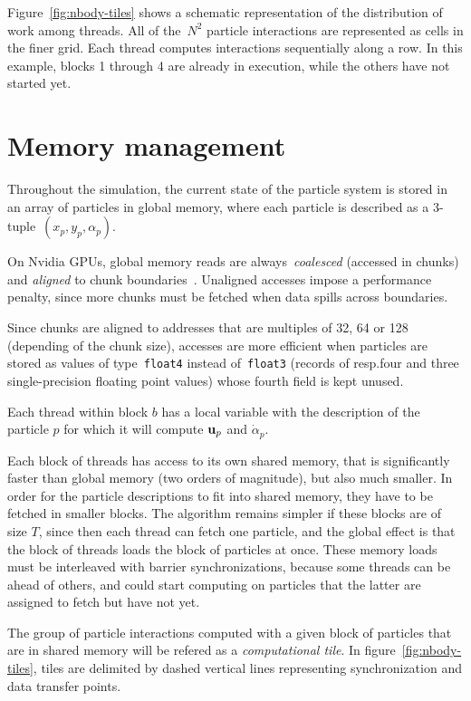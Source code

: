 Figure~\ref{fig:nbody-tiles} shows a schematic representation
of the distribution of work among threads.
All of the~\(N^2\) particle interactions are represented
as cells in the finer grid.
Each thread computes interactions sequentially along a row.
In this example, blocks 1 through 4 are already in execution,
while the others have not started yet.

\section{Memory management}
\label{sec:memory-management}

Throughout the simulation,
the current state of the particle system
is stored in an array of particles in global memory,
where each particle is described as a 3-tuple~\((x_p, y_p, α_p)\).

On Nvidia GPUs,
global memory reads are always~\emph{coalesced} (accessed in chunks)
and \emph{aligned} to chunk boundaries~\cite{cudaprog2}.
Unaligned accesses impose a performance penalty,
since more chunks must be fetched
when data spills across boundaries.

Since chunks are aligned to addresses that are
multiples of 32, 64 or 128 (depending of the chunk size),
accesses are more efficient when particles are stored
as values of type~\texttt{float4} instead of~\texttt{float3}
(records of resp.\@ four and three single-precision floating point values)
whose fourth field is kept unused.

Each thread within block \(b\)
has a local variable with the description of the particle \(p\)
for which it will compute \(\mathbf u_p\) and \(\dot{α}_p\).

Each block of threads has access to its own shared memory,
that is significantly faster than global memory
(two orders of magnitude), but also much smaller.
In order for the particle descriptions to fit into shared memory,
they have to be fetched in smaller blocks.
The algorithm remains simpler if these blocks are of size \(T\),
since then each thread can fetch one particle, and the global effect
is that the block of threads loads the block of particles at once.
These memory loads must be interleaved with barrier synchronizations,
because some threads can be ahead of others, and could start computing
on particles that the latter are assigned to fetch but have not yet.

The group of particle interactions computed
with a given block of particles that are in shared memory
will be refered as a \emph{computational tile}.
In figure~\ref{fig:nbody-tiles},
tiles are delimited by dashed vertical lines
representing synchronization and data transfer points.

